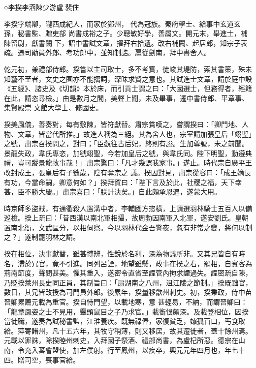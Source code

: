 
\begin{pinyinscope}

 ○李揆李涵陳少游盧裴住



 李揆字端卿，隴西成紀人，而家於鄭州，
 代為冠族。秦府學士、給事中玄道玄孫，秘書監、贈吏部
 尚書成裕之子。少聰敏好學，善屬文。開元末，舉進士，補陳留尉，獻書闕
 下，詔中書試文章，擢拜右拾遺。改右補闕、起居郎，知宗子表疏。遷司勛員外郎、考功郎中，並知制誥。扈從劍南，拜中書舍人。



 乾元初，兼禮部侍郎。揆嘗以主司取士，多不考實，徒峻其堤防，索其書策，殊未知藝不至者，文史之囿亦不能摛詞，深昧求賢之意也。其試進士文章，請於庭中設《五經》、諸史及《切韻》本於床，而引貢士謂之曰：「大國選士，但務得者，經籍在此，請恣尋檢。」由是數月之間，美聲上聞，未及畢事，遷中書侍郎、平章事、集賢殿崇
 文館大學士、修國史。



 揆美風儀，善奏對，每有敷陳，皆符獻替。肅宗賞嘆之，嘗謂揆曰：「卿門地、人物、文章，皆當代所推。」故進人稱為三絕。其為舍人也，宗室請加張皇后「翊聖」之號，肅宗召揆問之，對曰；「臣觀往古后妃，終則有謚。生加尊號，未之前聞。景龍失政，韋氏專恣，加號翊聖，今若加皇后之號，與韋氏同。陛下明聖，動遵典禮，豈可蹤景龍故事哉！」肅宗驚曰：「凡才幾誤我家事。」遂止。時代宗自廣平王改封成王，張皇后有子數歲，陰有奪宗之
 議。揆因對見，肅宗從容曰：「成王嫡長有功，今當命嗣，卿意何如？」揆拜賀曰：「陛下言及於此，社稷之福，天下幸甚，臣不勝大慶。」肅宗喜曰：「朕計決矣。」自此頗承恩遇，遂蒙大用。



 時京師多盜賊，有通衢殺人置溝中者，李輔國方恣橫，上請選羽林騎士五百人以備巡檢。揆上疏曰：「昔西漢以南北軍相攝，故周勃因南軍入北軍，遂安劉氏。皇朝置南北衙，文武區分，以相伺察。今以羽林代金吾警夜，忽有非常之變，將何以制之？」遂制罷羽林之請。



 揆在相位，決事獻替，雖甚博辨，性銳於名利，深為物議所非。又其兄皆自有時名，滯於冗官，竟不引進。同列呂諲，地望雖懸，政事在揆之右，罷相，自賓客為荊南節度，聲問甚美。懼其重入，遂密令直省至諲管內拘求諲過失。諲密疏自陳，乃貶揆萊州長史同正員，其制旨曰：「扇湖南之八州，沮江陵之節制。」揆既黜官，數日，其兄皆改授為司門員外郎。後累年，揆量移歙州刺史。初，揆秉政，侍中苗晉卿累薦元載為重官。揆自恃門望，以載地寒，意
 甚輕易，不納，而謂晉卿曰：「龍章鳳姿之士不見用，麞頭鼠目之子乃求官。」載銜恨頗深。及載登相位，因揆當徙職，遂奏為試秘書監，江淮養疾。既無祿俸，家復貧乏，孀孤百口，丐食取給。萍寄諸州，凡十五六年，其牧守稍薄，則又移居，故其遷徙者，蓋十餘州焉。元載以罪誅，除揆睦州刺史，入拜國子祭酒、禮部尚書，為盧杞所惡。德宗在山南，令充入蕃會盟使，加左僕射。行至鳳州，以疾卒，興元元年四月也，年七十四。贈司空，喪事官給。




\end{pinyinscope}
